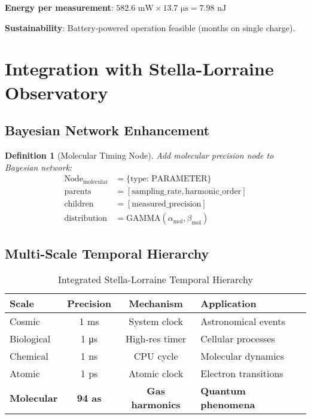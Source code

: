 \documentclass[12pt,a4paper]{article}
\newtheorem{definition}[theorem]{Definition}
\begin{document}
\textbf{Energy per measurement}: $582.6 \text{ mW} \times 13.7 \text{ μs} = 7.98 \text{ nJ}$

\textbf{Sustainability}: Battery-powered operation feasible (months on single charge).

\section{Integration with Stella-Lorraine Observatory}

\subsection{Bayesian Network Enhancement}

\begin{definition}[Molecular Timing Node]
Add molecular precision node to Bayesian network:
\begin{align}
\text{Node}_{\text{molecular}} &= \{\text{type: PARAMETER}\} \\
\text{parents} &= [\text{sampling\_rate}, \text{harmonic\_order}] \\
\text{children} &= [\text{measured\_precision}] \\
\text{distribution} &= \text{GAMMA}(\alpha_{\text{mol}}, \beta_{\text{mol}})
\end{align}
\end{definition}

\subsection{Multi-Scale Temporal Hierarchy}

\begin{table}[H]
\centering
\caption{Integrated Stella-Lorraine Temporal Hierarchy}
\begin{tabular}{lccl}
\toprule
Scale & Precision & Mechanism & Application \\
\midrule
Cosmic & 1 ms & System clock & Astronomical events \\
Biological & 1 μs & High-res timer & Cellular processes \\
Chemical & 1 ns & CPU cycle & Molecular dynamics \\
Atomic & 1 ps & Atomic clock & Electron transitions \\
\textbf{Molecular} & \textbf{94 as} & \textbf{Gas harmonics} & \textbf{Quantum phenomena} \\
\bottomrule
\end{tabular}
\end{table}
\end{document}
